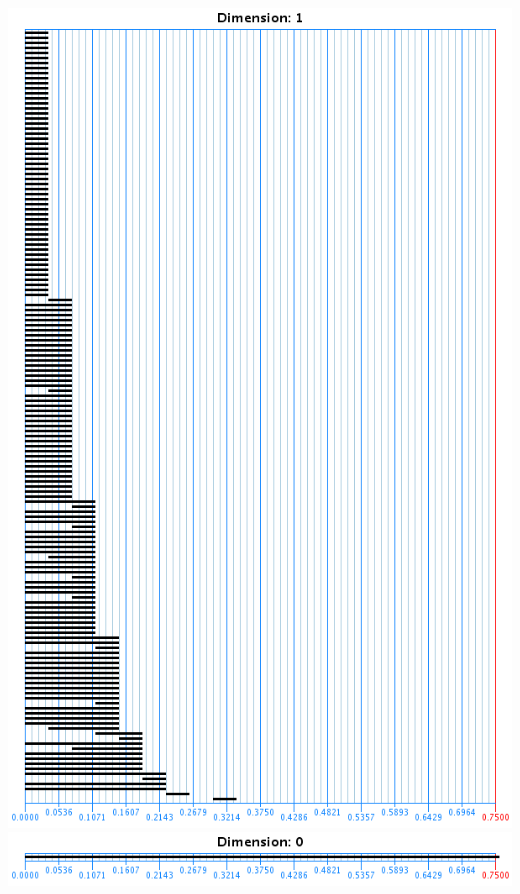 \documentclass{beamer}
\begin{document}
\begin{frame}
\begin{columns}
\begin{column}{0.3\textwidth}
      \noindent\includegraphics[width=\textwidth]{cyclo8ane2_1} \\
      \noindent\includegraphics[width=\textwidth]{cyclo8ane2_0} \\
    \end{column}
  \end{columns}

\end{frame}
\end{document}
